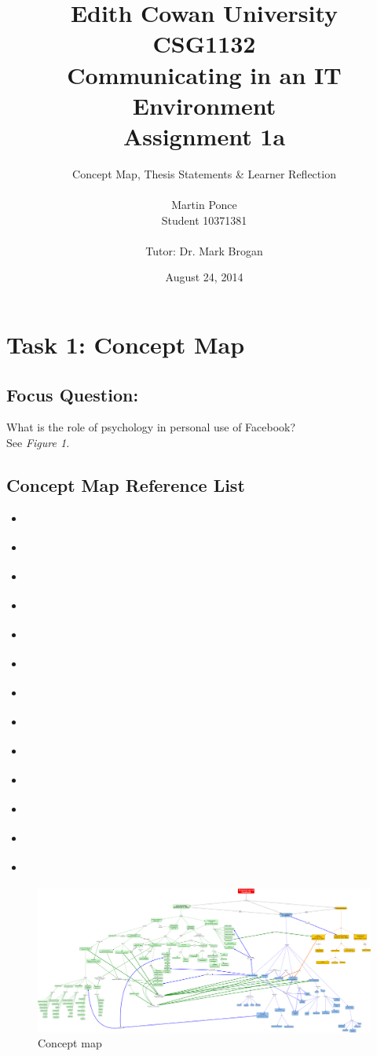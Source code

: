 \documentclass[12pt,a4paper]{report}
\title{Edith Cowan University\\CSG1132\\Communicating in an IT Environment\\Assignment 1a}
\author{Concept Map, Thesis Statements \& Learner Reflection\\\\
		Martin Ponce\\Student 10371381\\\\Tutor: Dr. Mark Brogan}
\date{August 24, 2014}
\begin{document}
\maketitle

\tableofcontents
\makeatletter

\newpage
\section*{\textsf{Task 1: Concept Map}}

\subsection*{\textsf{Focus Question:}}
What is the role of psychology in personal use of Facebook?\\

See \emph{Figure 1.}

\subsection*{\textsf{Concept Map Reference List}}
\begin{itemize}
\item \citet*{Pai2013}
\item \citet*{McAndrew2012}
\item \citet*{Nadkarni2012}
\item \citet*{Moore2012}
\item \citet*{Ross2009}
\item \citet*{Toma2013}
\item \citet*{Ellison2007}
\item \citet*{Park2011}
\item \citet*{Anderson2012}
\item \citet*{Ku2013}
\item \citet*{Rosen2013}
\item \citet*{Trottier2012}
\item \citet*{Kwan2013}
\end{itemize}

\newpage
{}
\thispagestyle{fancylscape}
\begin{landscape}
\begin{figure}[H]
	\centering
	\caption{Concept map}
	\includegraphics[scale=0.16]{./img/CSG1132_Facebook_Cmap_v9.png}
\end{figure}
\end{landscape}
\restoregeometry
\end{document}
